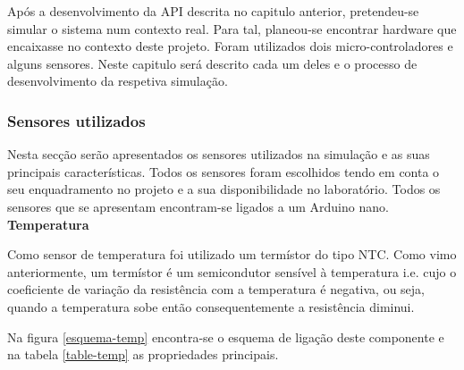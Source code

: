 Após a desenvolvimento da API descrita no capitulo anterior, pretendeu-se simular o sistema num contexto real. Para tal, planeou-se encontrar hardware que encaixasse no contexto deste projeto. Foram utilizados dois micro-controladores e alguns sensores. Neste capitulo será descrito cada um deles e o processo de desenvolvimento da respetiva simulação.  

\newpage

\subsubsection{Sensores utilizados}

Nesta secção serão apresentados os sensores utilizados na simulação e as suas principais características. Todos os sensores foram escolhidos tendo em conta o seu enquadramento no projeto e a sua disponibilidade no laboratório. Todos os sensores que se apresentam encontram-se ligados a um Arduino nano. \\


\textbf{Temperatura}


Como sensor de temperatura foi utilizado um termístor do tipo \ac{NTC}. Como vimo anteriormente, um termístor é um semicondutor sensível à temperatura i.e. cujo o coeficiente de variação da resistência com a temperatura é negativa, ou seja, quando a temperatura sobe então consequentemente a resistência diminui. 

Na figura \ref{esquema-temp} encontra-se o esquema de ligação deste componente e na tabela \ref{table-temp} as propriedades principais. 

